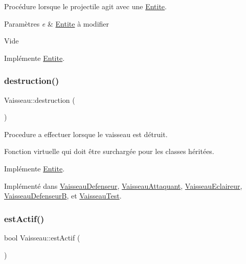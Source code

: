 Procédure lorsque le projectile agit avec une \hyperlink{class_entite}{Entite}. 


\begin{DoxyParams}{Paramètres}
{\em e} & \hyperlink{class_entite}{Entite} à modifier\\
\hline
\end{DoxyParams}
Vide 

Implémente \hyperlink{class_entite_a848ec47afac1d7ba970a2bcab5dc7b3b}{Entite}.

\mbox{\label{class_vaisseau_af4f490c5fd9e171b23067ec73aa737ad}} 
\subsubsection{\texorpdfstring{destruction()}{destruction()}}
{\footnotesize\ttfamily Vaisseau\+::destruction (\begin{DoxyParamCaption}{ }\end{DoxyParamCaption})\hspace{0.3cm}{\ttfamily [pure virtual]}}



Procedure a effectuer lorsque le vaisseau est détruit. 

Fonction virtuelle qui doit être surchargée pour les classes héritées. 

Implémente \hyperlink{class_entite_af5c424f69b2c880ae9c12786abd28592}{Entite}.



Implémenté dans \hyperlink{class_vaisseau_defenseur_a6816d325d737269cddc6310e7f68b222}{Vaisseau\+Defenseur}, \hyperlink{class_vaisseau_attaquant_af804e1fd491301c2385e10d88f4892a6}{Vaisseau\+Attaquant}, \hyperlink{class_vaisseau_eclaireur_a4f65343b67301d7fa98f5e02337cc1e1}{Vaisseau\+Eclaireur}, \hyperlink{class_vaisseau_defenseur_b_aba88319dcc7540dce39c164fa9853732}{Vaisseau\+DefenseurB}, et \hyperlink{class_vaisseau_test_a5b8b67886ecb73d8f720f8499ef3c378}{Vaisseau\+Test}.

\mbox{\label{class_vaisseau_a9e106e9b7026cdd288ea4745aa1df652}} 
\subsubsection{\texorpdfstring{est\+Actif()}{estActif()}}
{\footnotesize\ttfamily bool Vaisseau\+::est\+Actif (\begin{DoxyParamCaption}{ }\end{DoxyParamCaption})}

